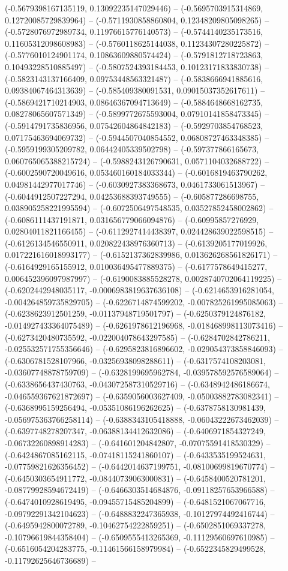 	(-0.5679398167135119, 0.13092235147029446) -- (-0.5695703915314869, 0.12720085729839964) -- (-0.5711930858860804, 0.12348209805098265) -- (-0.5728076972989734, 0.11976615776140573) -- (-0.5744140235173516, 0.11605312098608983) -- (-0.5760118625144038, 0.11234307280225872) -- (-0.5776010124901174, 0.10863609880574424) -- (-0.5791812718723863, 0.10493228510885497) -- (-0.5807524393184453, 0.10123171833830738) -- (-0.5823143137166409, 0.09753448563321487) -- (-0.5838666941885616, 0.09384067464313639) -- (-0.585409380091531, 0.09015037352617611) -- (-0.5869421710214903, 0.08646367094713649) -- (-0.5884648668162735, 0.08278065607571349) -- (-0.5899772675593004, 0.07910141858473345) -- (-0.5914791735836956, 0.07542604864842183) -- (-0.5929703854768523, 0.07175463694069732) -- (-0.5944507040854552, 0.06808727463348385) -- (-0.5959199305209782, 0.06442405339502798) -- (-0.597377866165673, 0.060765065388215724) -- (-0.5988243126790631, 0.0571104032688722) -- (-0.6002590720049616, 0.053460160184033344) -- (-0.6016819463790262, 0.04981442977017746) -- (-0.6030927383368673, 0.0461733061513967) -- (-0.6044912507227294, 0.04253688393749555) -- (-0.605877286698755, 0.038905258221995594) -- (-0.6072506497548535, 0.03527852458002862) -- (-0.6086111437191871, 0.031656779066094876) -- (-0.60995857276929, 0.02804011821166455) -- (-0.6112927414438397, 0.024428639022598515) -- (-0.6126134546550911, 0.020822438976360713) -- (-0.6139205177019926, 0.017221616018993177) -- (-0.6152137362839986, 0.013626268561826171) -- (-0.6164929165155912, 0.010036495477889375) -- (-0.6177578649415277, 0.006452396097987997) -- (-0.6190083885528278, 0.0028740702064119225) -- (-0.6202442948035117, -0.0006983819637636108) -- (-0.6214653916281054, -0.004264859735829705) -- (-0.6226714874599202, -0.007825261995085063) -- (-0.6238623912501259, -0.01137948719501797) -- (-0.6250379124876182, -0.014927433364075489) -- (-0.6261978612196968, -0.018468998113073416) -- (-0.6273420480735592, -0.022004078643297585) -- (-0.6284702842786211, -0.025532571755356646) -- (-0.6295823816896602, -0.029054373858846093) -- (-0.6306781528107966, -0.03256938098288611) -- (-0.6317574108203081, -0.03607748878759709) -- (-0.6328199695962784, -0.039578592576589064) -- (-0.6338656437430763, -0.043072587310529716) -- (-0.6348942486186674, -0.046559367621872697) -- (-0.6359056003627409, -0.05003882783082341) -- (-0.6368995159256494, -0.05351086196262625) -- (-0.6378758130981439, -0.056975363766258114) -- (-0.6388343105418888, -0.06043222673462039) -- (-0.6397748278207347, -0.06388134412632086) -- (-0.6406971854327249, -0.06732260898914283) -- (-0.641601204842807, -0.07075591418530329) -- (-0.6424867085162115, -0.07418115241860107) -- (-0.6433535199524631, -0.07759821626356452) -- (-0.6442014637199751, -0.08100699819670774) -- (-0.6450303654911772, -0.08440739063000831) -- (-0.6458400520781201, -0.08779928594672419) -- (-0.6466303514684876, -0.09118257653966588) -- (-0.6474010928619495, -0.09455715485204899) -- (-0.6481521067067716, -0.09792291342104623) -- (-0.6488832247365938, -0.10127974492416744) -- (-0.6495942800072789, -0.10462754222859251) -- (-0.6502851069337278, -0.10796619844358404) -- (-0.6509555413265369, -0.11129560697610985) -- (-0.6516054204283775, -0.11461566158979984) -- (-0.6522345829499528, -0.11792625646736689) -- 